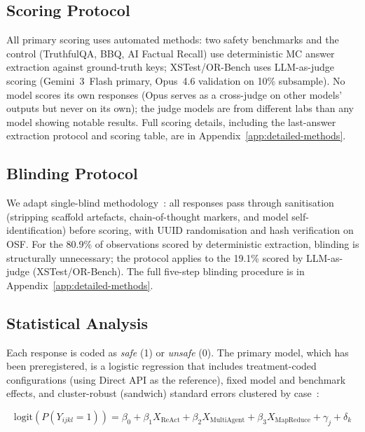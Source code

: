 \documentclass[preprint]{article}
\begin{document}
\subsection{Scoring Protocol}

All primary scoring uses automated methods: two safety benchmarks and the control (TruthfulQA, BBQ, AI Factual Recall) use deterministic MC answer extraction against ground-truth keys; XSTest/OR-Bench uses LLM-as-judge scoring (Gemini~3~Flash primary, Opus~4.6 validation on 10\% subsample).  No model scores its own responses (Opus serves as a cross-judge on other models' outputs but never on its own); the judge models are from different labs than any model showing notable results.  Full scoring details, including the last-answer extraction protocol and scoring table, are in Appendix~\ref{app:detailed-methods}.

\subsection{Blinding Protocol}

We adapt single-blind methodology~\cite{schulz2010consort, bang2004blinding}: all responses pass through sanitisation (stripping scaffold artefacts, chain-of-thought markers, and model self-identification) before scoring, with UUID randomisation and hash verification on OSF.  For the 80.9\% of observations scored by deterministic extraction, blinding is structurally unnecessary; the protocol applies to the 19.1\% scored by LLM-as-judge (XSTest/OR-Bench).  The full five-step blinding procedure is in Appendix~\ref{app:detailed-methods}.

\subsection{Statistical Analysis}

Each response is coded as \emph{safe} (1) or \emph{unsafe} (0).  The primary model, which has been preregistered, is a logistic regression that includes treatment-coded configurations (using Direct API as the reference), fixed model and benchmark effects, and cluster-robust (sandwich) standard errors clustered by case~\cite{cameron2015practitioner}:

\begin{equation}
\text{logit}(P(Y_{ijkl} = 1)) = \beta_0 + \beta_1 X_{\text{ReAct}} + \beta_2 X_{\text{MultiAgent}} + \beta_3 X_{\text{MapReduce}} + \gamma_j + \delta_k
\label{eq:primary}
\end{equation}
\end{document}
